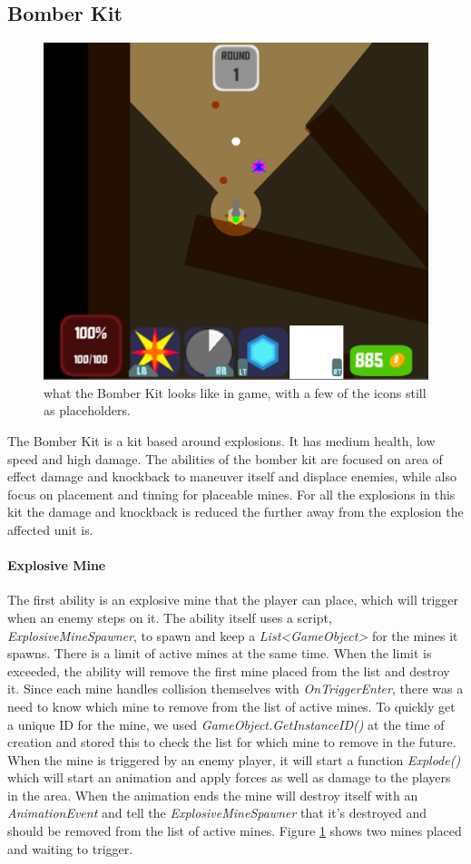 \subsection{Bomber Kit}
\begin{figure}[tbph]  %
  \centering
  \includegraphics[width=.75\textwidth]{images/BomberKitMinesPlaced}
  \caption[Screenshot of Bomber Kit with mines placed]{what the Bomber Kit looks like in game, with a few of the icons still as placeholders.}
  \label{fig:BomberKitMines}
\end{figure}
The Bomber Kit is a kit based around explosions. It has medium health, low speed and high damage. The abilities of the bomber kit are focused on area of effect damage and knockback to maneuver itself and displace enemies, while also focus on placement and timing for placeable mines. For all the explosions in this kit the damage and knockback is reduced the further away from the explosion the affected unit is.

\paragraph{Explosive Mine}
The first ability is an explosive mine that the player can place, which will trigger when an enemy steps on it. The ability itself uses a script, \emph{ExplosiveMineSpawner}, to spawn and keep a \emph{List<GameObject>} for the mines it spawns. There is a limit of active mines at the same time. When the limit is exceeded, the ability will remove the first mine placed from the list and destroy it. Since each mine handles collision themselves with \emph{OnTriggerEnter}, there was a need to know which mine to remove from the list of active mines. To quickly get a unique ID for the mine, we used \emph{GameObject.GetInstanceID()} at the time of creation and stored this to check the list for which mine to remove in the future. When the mine is triggered by an enemy player, it will start a function \emph{Explode()} which will start an animation and apply forces as well as damage to the players in the area. When the animation ends the mine will destroy itself with an \emph{AnimationEvent} and tell the \emph{ExplosiveMineSpawner} that it's destroyed and should be removed from the list of active mines. Figure \ref{fig:BomberKitMines} shows two mines placed and waiting to trigger.

